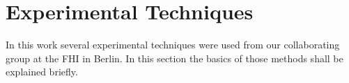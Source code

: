 \documentclass[11pt,DIV=13,BCOR=5mm,a4paper,headinclude]{scrbook}
\begin{document}
\appendix

\captionsetup{labelformat=myformat}
\def\thefigure{A.\arabic{figure}}
\def\thetable{A.\arabic{table}}
\section{Experimental Techniques}\label{exp_techniques}
In this work several experimental techniques were used from our collaborating group at the FHI in Berlin.
In this section the basics of those methods shall be explained briefly.
\end{document}
